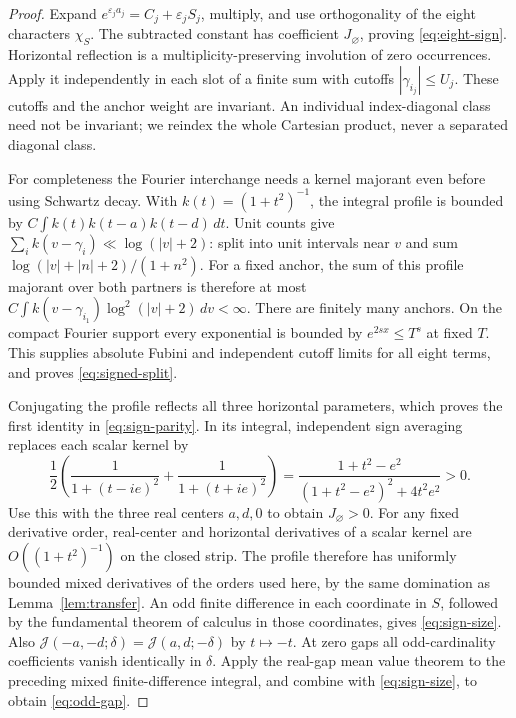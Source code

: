 \documentclass[11pt]{article}
\newcommand{\dd}{\,d}
\begin{document}
\begin{proof}
Expand $e^{\varepsilon_ja_j}=C_j+\varepsilon_jS_j$, multiply, and use
orthogonality of the eight characters $\chi_S$. The subtracted constant
has coefficient $J_\varnothing$, proving \eqref{eq:eight-sign}.
Horizontal reflection is a multiplicity-preserving involution of zero
occurrences. Apply it independently in each slot of a finite sum with
cutoffs $|\gamma_{i_j}|\leq U_j$. These cutoffs and the anchor weight are
invariant. An individual index-diagonal class need not be invariant;
we reindex the whole Cartesian product, never a separated diagonal class.

For completeness the Fourier interchange needs a kernel majorant even
before using Schwartz decay. With $k(t)=(1+t^2)^{-1}$, the integral profile
is bounded by $C\int k(t)k(t-a)k(t-d)\dd t$. Unit counts give
$\sum_i k(v-\gamma_i)\ll\log(|v|+2)$: split into unit intervals near
$v$ and sum $\log(|v|+|n|+2)/(1+n^2)$.
For a fixed anchor, the sum of this profile majorant over both partners
is therefore at most
$C\int k(v-\gamma_{i_1})\log^2(|v|+2)\dd v<\infty$.
There are finitely many anchors. On the compact Fourier support every
exponential is bounded by $e^{2sx}\leq T^s$ at fixed $T$.
This supplies absolute Fubini and independent cutoff limits for all eight
terms, and proves \eqref{eq:signed-split}.

Conjugating the profile reflects all three horizontal parameters, which
proves the first identity in \eqref{eq:sign-parity}. In its integral,
independent sign averaging replaces each scalar kernel by
\[
 \frac12\left(\frac1{1+(t-ie)^2}+\frac1{1+(t+ie)^2}\right)
 =\frac{1+t^2-e^2}{(1+t^2-e^2)^2+4t^2e^2}>0.
\]
Use this with the three real centers $a,d,0$ to obtain $J_\varnothing>0$.
For any fixed derivative order, real-center and horizontal derivatives
of a scalar kernel are $O((1+t^2)^{-1})$ on the closed strip. The profile
therefore has uniformly bounded mixed derivatives of the orders used here,
by the same domination as Lemma~\ref{lem:transfer}.
An odd finite difference in each coordinate in $S$, followed by the
fundamental theorem of calculus in those coordinates, gives
\eqref{eq:sign-size}. Also
$\mathcal J(-a,-d;\delta)=\mathcal J(a,d;-\delta)$ by $t\mapsto-t$.
At zero gaps all odd-cardinality coefficients vanish identically in
$\delta$. Apply the real-gap mean value theorem to the preceding mixed
finite-difference integral, and combine with \eqref{eq:sign-size}, to
obtain \eqref{eq:odd-gap}.
\end{proof}
\end{document}
